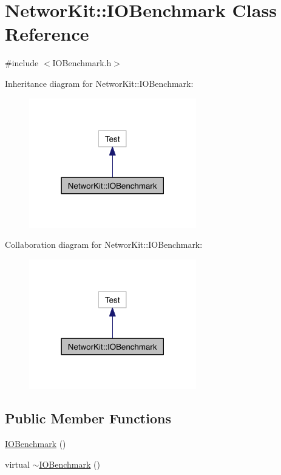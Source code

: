 \hypertarget{class_networ_kit_1_1_i_o_benchmark}{\section{Networ\-Kit\-:\-:I\-O\-Benchmark Class Reference}
\label{class_networ_kit_1_1_i_o_benchmark}
}


{\ttfamily \#include $<$I\-O\-Benchmark.\-h$>$}



Inheritance diagram for Networ\-Kit\-:\-:I\-O\-Benchmark\-:\nopagebreak
\begin{figure}[H]
\begin{center}
\leavevmode
\includegraphics[width=206pt]{class_networ_kit_1_1_i_o_benchmark__inherit__graph}
\end{center}
\end{figure}


Collaboration diagram for Networ\-Kit\-:\-:I\-O\-Benchmark\-:\nopagebreak
\begin{figure}[H]
\begin{center}
\leavevmode
\includegraphics[width=206pt]{class_networ_kit_1_1_i_o_benchmark__coll__graph}
\end{center}
\end{figure}
\subsection*{Public Member Functions}
\begin{DoxyCompactItemize}
\item 
\hyperlink{class_networ_kit_1_1_i_o_benchmark_a5c8ad846f3da3bea06de7a490de6efc3}{I\-O\-Benchmark} ()
\item 
virtual \hyperlink{class_networ_kit_1_1_i_o_benchmark_a846c75ef55c2ef9def07b0f918bf4571}{$\sim$\-I\-O\-Benchmark} ()
\end{DoxyCompactItemize}


